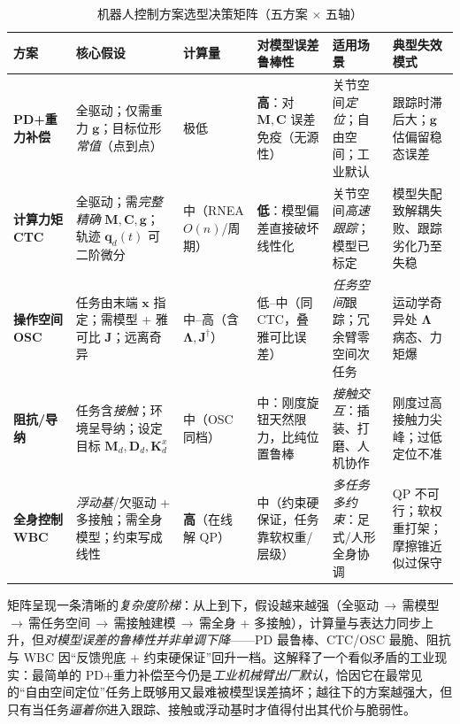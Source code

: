 \begin{table}[H]\centering\footnotesize
\caption{机器人控制方案选型决策矩阵（五方案 $\times$ 五轴）}
\label{tab:css-decision}
\renewcommand{\arraystretch}{1.25}
\begin{tabular}{p{} p{} p{} p{} p{} p{}}
\toprule
方案 & 核心假设 & 计算量 & 对模型误差鲁棒性 & 适用场景 & 典型失效模式 \\
\midrule
\textbf{PD+重力补偿}\newline{\scriptsize(\cref{sec:ctrl-robot-pd})} &
全驱动；仅需重力 $\mathbf{g}$；目标位形\emph{常值}（点到点） &
极低 &
\textbf{高}：对 $\mathbf{M},\mathbf{C}$ 误差免疫（无源性） &
关节空间\emph{定位}；自由空间；工业默认 &
跟踪时滞后大；$\mathbf{g}$ 估偏留稳态误差 \\
\textbf{计算力矩 CTC}\newline{\scriptsize(\cref{sec:ctrl-robot-ctc})} &
全驱动；需\emph{完整精确} $\mathbf{M},\mathbf{C},\mathbf{g}$；轨迹 $\mathbf{q}_d(t)$ 可二阶微分 &
中（RNEA $O(n)$/周期） &
\textbf{低}：模型偏差直接破坏线性化 &
关节空间\emph{高速跟踪}；模型已标定 &
模型失配致解耦失败、跟踪劣化乃至失稳 \\
\textbf{操作空间 OSC}\newline{\scriptsize(\cref{sec:ctrl-robot-osc})} &
任务由末端 $\mathbf{x}$ 指定；需模型 + 雅可比 $\mathbf{J}$；远离奇异 &
中--高（含 $\boldsymbol{\Lambda},\mathbf{J}^\dagger$） &
低--中（同 CTC，叠雅可比误差） &
\emph{任务空间}跟踪；冗余臂零空间次任务 &
运动学奇异处 $\boldsymbol{\Lambda}$ 病态、力矩爆 \\
\textbf{阻抗/导纳}\newline{\scriptsize(\cref{sec:ctrl-robot-impedance})} &
任务含\emph{接触}；环境呈导纳；设定目标 $\mathbf{M}_d,\mathbf{D}_d,\mathbf{K}_d^x$ &
中（OSC 同档） &
中：刚度旋钮天然限力，比纯位置鲁棒 &
\emph{接触交互}：插装、打磨、人机协作 &
刚度过高接触力尖峰；过低定位不准 \\
\textbf{全身控制 WBC}\newline{\scriptsize(\cref{sec:ctrl-robot-wbc})} &
\emph{浮动基}/欠驱动 + 多接触；需全身模型；约束写成线性 &
\textbf{高}（在线解 QP） &
中（约束硬保证，任务靠软权重/层级） &
\emph{多任务多约束}：足式/人形全身协调 &
QP 不可行；软权重打架；摩擦锥近似过保守 \\
\bottomrule
\end{tabular}
\end{table}

\begin{insight}
矩阵呈现一条清晰的\emph{复杂度阶梯}：从上到下，假设越来越强（全驱动\,$\to$\,需模型\,$\to$\,需任务空间\,$\to$\,需接触建模\,$\to$\,需全身 + 多接触），计算量与表达力同步上升，但\emph{对模型误差的鲁棒性并非单调下降}——PD 最鲁棒、CTC/OSC 最脆、阻抗与 WBC 因“反馈兜底 + 约束硬保证”回升一档。这解释了一个看似矛盾的工业现实：最简单的 PD+重力补偿至今仍是\emph{工业机械臂出厂默认}，恰因它在最常见的“自由空间定位”任务上既够用又最难被模型误差搞坏；越往下的方案越强大，但只有当任务\emph{逼着你}进入跟踪、接触或浮动基时才值得付出其代价与脆弱性。
\end{insight}

